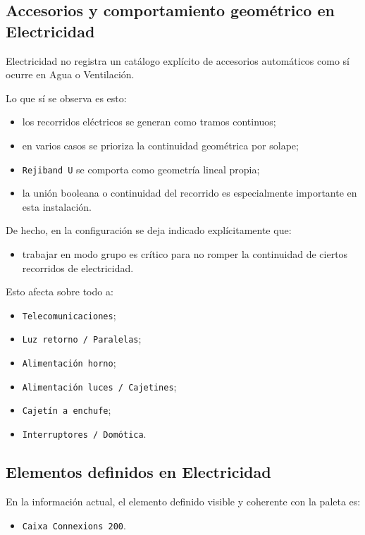 \documentclass[12pt,a4paper]{article}
\begin{document}
\subsection{Accesorios y comportamiento geométrico en Electricidad}

Electricidad no registra un catálogo explícito de accesorios automáticos como sí ocurre en Agua o Ventilación.

Lo que sí se observa es esto:

\begin{itemize}
\item los recorridos eléctricos se generan como tramos continuos;
\item en varios casos se prioriza la continuidad geométrica por solape;
\item \texttt{Rejiband U} se comporta como geometría lineal propia;
\item la unión booleana o continuidad del recorrido es especialmente importante en esta instalación.
\end{itemize}

De hecho, en la configuración se deja indicado explícitamente que:

\begin{itemize}
\item trabajar en modo grupo es crítico para no romper la continuidad de ciertos recorridos de electricidad.
\end{itemize}

Esto afecta sobre todo a:

\begin{itemize}
\item \texttt{Telecomunicaciones};
\item \texttt{Luz retorno / Paralelas};
\item \texttt{Alimentación horno};
\item \texttt{Alimentación luces / Cajetines};
\item \texttt{Cajetín a enchufe};
\item \texttt{Interruptores / Domótica}.
\end{itemize}

\subsection{Elementos definidos en Electricidad}

En la información actual, el elemento definido visible y coherente con la paleta es:

\begin{itemize}
\item \texttt{Caixa Connexions 200}.
\end{itemize}
\end{document}
